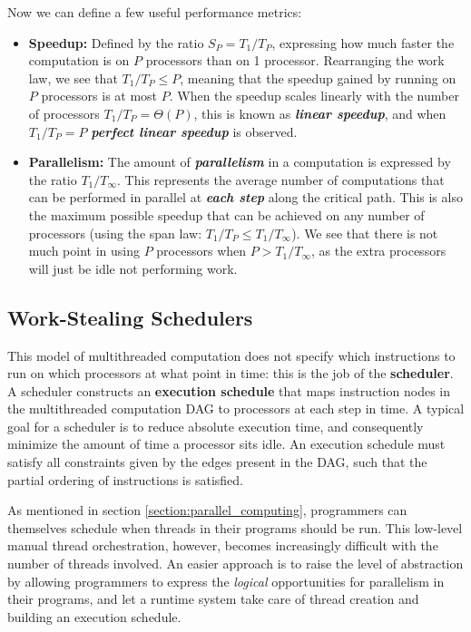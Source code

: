 \documentclass[bsc,frontabs,singlespacing,parskip,deptreport,normalheadings]{infthesis}
\begin{document}
Now we can define a few useful performance metrics:

\begin{itemize}
    \item \textbf{Speedup:} Defined by the ratio \(S_P = T_1 / T_P\),
        expressing how much faster the computation is on \(P\) processors
        than on 1 processor. Rearranging the work law, we see that \(T_1 /
        T_P \leq P\), meaning that the speedup gained by running on \(P\)
        processors is at most \(P\). When the speedup scales linearly
        with the number of processors \(T_1 / T_P = \Theta(P)\), this is known
        as \textit{\textbf{linear speedup}}, and when \(T_1 / T_P = P\)
        \textit{\textbf{perfect linear speedup}} is observed.
    \item \textbf{Parallelism:} The amount of \textit{\textbf{parallelism}} in a
        computation is expressed by the ratio \(T_1 / T_\infty\). This
        represents the average number of computations that can be performed
        in parallel at \textit{\textbf{each step}} along the critical path. This is
        also the maximum possible speedup that can be achieved on any number
        of processors (using the span law: \(T_1 / T_P \leq T_1 /
        T_\infty\)). We see that there is not much point in using
        \(P\) processors when \(P > T_1 / T_\infty\), as the extra
        processors will just be idle not performing work.
\end{itemize}

\subsection{Work-Stealing Schedulers}
\label{subsection:work_stealing}

This model of multithreaded computation does not specify which instructions to
run on which processors at what point in time: this is the job of the
\textbf{scheduler}. A scheduler constructs an \textbf{execution schedule} that
maps instruction nodes in the multithreaded computation DAG to processors at
each step in time. A typical goal for a scheduler is to reduce absolute
execution time, and consequently minimize the amount of time a processor sits
idle. An execution schedule must satisfy all constraints given by the edges
present in the DAG, such that the partial ordering of instructions is satisfied.

As mentioned in section \ref{section:parallel_computing}, programmers can
themselves schedule when threads in their programs should be run. This
low-level manual thread orchestration, however, becomes increasingly difficult
with the number of threads involved. An easier approach is to raise the level of
abstraction by allowing programmers to express the \textit{logical}
opportunities for parallelism in their programs, and let a runtime system take
care of thread creation and building an execution schedule.
\end{document}
